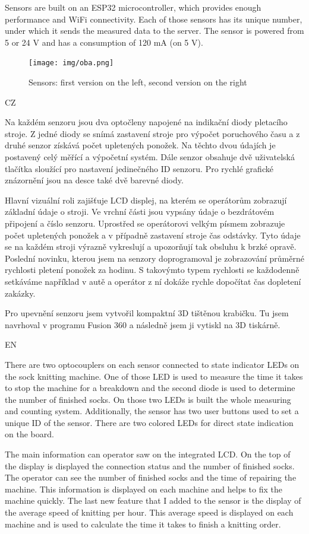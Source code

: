 \documentclass[12pt, a4paper]{article}
\begin{document}
Sensors are built on an ESP32 microcontroller, which provides enough performance and WiFi connectivity.
Each of those sensors has its unique number, under which it sends the measured data to the server.
The sensor is powered from 5 or 24 V and has a consumption of 120 mA (on 5 V).

\begin{figure}[t]
    \centering
    \texttt{[image: img/oba.png]}
    \caption{Sensors: first version on the left, second version on the right}
    \label{fig:dveVerze}
\end{figure}

CZ

Na každém senzoru jsou dva optočleny napojené na indikační diody pletacího stroje.
Z jedné diody se snímá zastavení stroje pro výpočet poruchového času a z druhé senzor získává počet upletených ponožek.
Na těchto dvou údajích je postavený celý měřící a výpočetní systém.
Dále senzor obsahuje dvě uživatelská tlačítka sloužící pro nastavení jedinečného ID senzoru.
Pro rychlé grafické znázornění jsou na desce také dvě barevné diody.

Hlavní vizuální roli zajišťuje LCD displej, na kterém se operátorům zobrazují základní údaje o stroji.
Ve vrchní části jsou vypsány údaje o bezdrátovém připojení a číslo senzoru.
Uprostřed se operátorovi velkým písmem zobrazuje počet upletených ponožek a v případně zastavení stroje čas odstávky.
Tyto údaje se na každém stroji výrazně vykreslují a upozorňují tak obsluhu k brzké opravě.
Poslední novinku, kterou jsem na senzory doprogramoval je zobrazování průměrné rychlosti pletení ponožek za hodinu.
S takovýmto typem rychlosti se každodenně setkáváme například v autě a operátor z ní dokáže rychle dopočítat čas dopletení zakázky.

Pro upevnění senzoru jsem vytvořil kompaktní 3D tištěnou krabičku.
Tu jsem navrhoval v programu Fusion 360 a následně jsem ji vytiskl na 3D tiskárně.

EN

There are two optocouplers on each sensor connected to state indicator LEDs on the sock knitting machine.
One of those LED is used to measure the time it takes to stop the machine for a breakdown and the second diode is used to determine the number of finished socks.
On those two LEDs is built the whole measuring and counting system.
Additionally, the sensor has two user buttons used to set a unique ID of the sensor.
There are two colored LEDs for direct state indication on the board.

The main information can operator saw on the integrated LCD.
On the top of the display is displayed the connection status and the number of finished socks.
The operator can see the number of finished socks and the time of repairing the machine.
This information is displayed on each machine and helps to fix the machine quickly.
The last new feature that I added to the sensor is the display of the average speed of knitting per hour.
This average speed is displayed on each machine and is used to calculate the time it takes to finish a knitting order.
\end{document}
